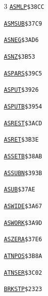 \begin{multicols}{3}
\noindent\hyperlink{l:ASMLP}{\texttt{ASMLP}}\hfill\texttt{\$38CC~\phantom{000}\llap{\pageref{l:ASMLP}}}\par
\noindent\hyperlink{l:ASMSUB}{\texttt{ASMSUB}}\hfill\texttt{\$37C9~\phantom{000}\llap{\pageref{l:ASMSUB}}}\par
\noindent\hyperlink{l:ASNEG}{\texttt{ASNEG}}\hfill\texttt{\$3AD6~\phantom{000}\llap{\pageref{l:ASNEG}}}\par
\noindent\hyperlink{l:ASNZ}{\texttt{ASNZ}}\hfill\texttt{\$3B53~\phantom{000}\llap{\pageref{l:ASNZ}}}\par
\noindent\hyperlink{l:ASPARS}{\texttt{ASPARS}}\hfill\texttt{\$39C5~\phantom{000}\llap{\pageref{l:ASPARS}}}\par
\noindent\hyperlink{l:ASPUT}{\texttt{ASPUT}}\hfill\texttt{\$3926~\phantom{000}\llap{\pageref{l:ASPUT}}}\par
\noindent\hyperlink{l:ASPUTB}{\texttt{ASPUTB}}\hfill\texttt{\$3954~\phantom{000}\llap{\pageref{l:ASPUTB}}}\par
\noindent\hyperlink{l:ASREST}{\texttt{ASREST}}\hfill\texttt{\$3ACD~\phantom{000}\llap{\pageref{l:ASREST}}}\par
\noindent\hyperlink{l:ASRET}{\texttt{ASRET}}\hfill\texttt{\$3B3E~\phantom{000}\llap{\pageref{l:ASRET}}}\par
\noindent\hyperlink{l:ASSETB}{\texttt{ASSETB}}\hfill\texttt{\$38AB~\phantom{000}\llap{\pageref{l:ASSETB}}}\par
\noindent\hyperlink{l:ASSUBN}{\texttt{ASSUBN}}\hfill\texttt{\$393B~\phantom{000}\llap{\pageref{l:ASSUBN}}}\par
\noindent\hyperlink{l:ASUB}{\texttt{ASUB}}\hfill\texttt{\$37AE~\phantom{000}\llap{\pageref{l:ASUB}}}\par
\noindent\hyperlink{l:ASWIDE}{\texttt{ASWIDE}}\hfill\texttt{\$3A67~\phantom{000}\llap{\pageref{l:ASWIDE}}}\par
\noindent\hyperlink{l:ASWORK}{\texttt{ASWORK}}\hfill\texttt{\$3A9D~\phantom{000}\llap{\pageref{l:ASWORK}}}\par
\noindent\hyperlink{l:ASZERA}{\texttt{ASZERA}}\hfill\texttt{\$37E6~\phantom{000}\llap{\pageref{l:ASZERA}}}\par
\noindent\hyperlink{l:ATNPOS}{\texttt{ATNPOS}}\hfill\texttt{\$3B8A~\phantom{000}\llap{\pageref{l:ATNPOS}}}\par
\noindent\hyperlink{l:ATNSER}{\texttt{ATNSER}}\hfill\texttt{\$3C02~\phantom{000}\llap{\pageref{l:ATNSER}}}\par
\noindent\hyperlink{l:BRKSTP}{\texttt{BRKSTP}}\hfill\texttt{\$2323~\phantom{000}\llap{\pageref{l:BRKSTP}}}\par

\end{multicols}
